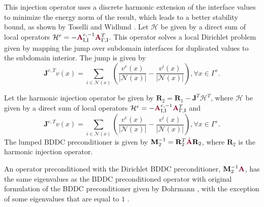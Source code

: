 This injection operator uses a discrete harmonic extension of the interface values to minimize the energy norm of the result, which leads to a better stability bound, as shown by Toselli and Widlund \cite{toselli2006domain}.
Let $\mathcal{H}$ be given by a direct sum of local operators $\mathcal{H}^e = - {\color{burgundy}\mathbf{A}}_{\text{I}, \text{I}}^{e, -1} {\color{burgundy}\mathbf{A}}_{\Gamma, \text{I}}^T$.
This operator solves a local Dirichlet problem given by mapping the jump over subdomain interfaces for duplicated values to the subdomain interior.
The jump is given by
\begin{equation}
\mathbf{J}^{e, T} v \left( x \right) = \sum_{i \in \mathcal{N} \left( x \right)} \left( \frac{v^e \left( x \right)}{\lvert \mathcal{N} \left( x \right) \rvert} - \frac{v^i \left( x \right)}{\lvert \mathcal{N} \left( x \right) \rvert} \right), \forall x \in \Gamma^e.
\end{equation}

\begin{definition}
Let the harmonic injection operator be given by $\mathbf{R}_2 = \mathbf{R}_1 - \mathbf{J}^T \mathcal{H}^T$, where $\mathcal{H}$ be given by a direct sum of local operators $\mathcal{H}^e = - {\color{burgundy}\mathbf{A}}_{\text{I}, \text{I}}^{e, -1} {\color{burgundy}\mathbf{A}}_{\Gamma, \text{I}}^T$ and
\begin{equation}
\mathbf{J}^{e, T} v \left( x \right) = \sum_{i \in \mathcal{N} \left( x \right)} \left( \frac{v^e \left( x \right)}{\lvert \mathcal{N} \left( x \right) \rvert} - \frac{v^i \left( x \right)}{\lvert \mathcal{N} \left( x \right) \rvert} \right), \forall x \in \Gamma^e.
\end{equation}
The lumped BDDC preconditioner is given by $\mathbf{M}^{-1}_2 = \mathbf{R}_2^T \hat{\color{burgundy}\mathbf{A}} \mathbf{R}_2$, where $\mathbf{R}_2$ is the harmonic injection operator.
\label{def:dirichletbddc}
\end{definition}

An operator preconditioned with the Dirichlet BDDC preconditioner, $\mathbf{M}^{-1}_2 {\color{burgundy}\mathbf{A}}$, has the same eigenvalues as the BDDC preconditioned operator with original formulation of the BDDC preconditioner given by Dohrmann \cite{dohrmann2003preconditioner}, with the exception of some eigenvalues that are equal to $1$ \cite{li2007use}.
